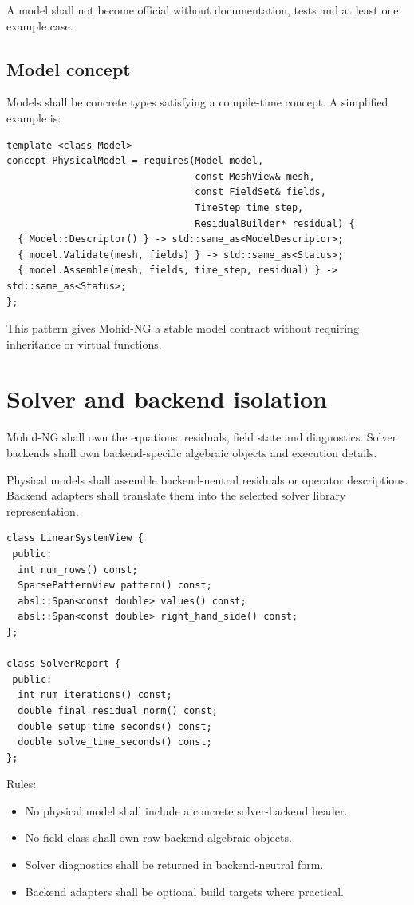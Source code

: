 \documentclass[11pt,a4paper]{article}
\begin{document}
A model shall not become official without documentation, tests and at least one example case.

\subsection{Model concept}

Models shall be concrete types satisfying a compile-time concept. A simplified example is:

\begin{lstlisting}
template <class Model>
concept PhysicalModel = requires(Model model,
                                 const MeshView& mesh,
                                 const FieldSet& fields,
                                 TimeStep time_step,
                                 ResidualBuilder* residual) {
  { Model::Descriptor() } -> std::same_as<ModelDescriptor>;
  { model.Validate(mesh, fields) } -> std::same_as<Status>;
  { model.Assemble(mesh, fields, time_step, residual) } -> std::same_as<Status>;
};
\end{lstlisting}

This pattern gives Mohid-NG a stable model contract without requiring inheritance or virtual functions.

\section{Solver and backend isolation}

Mohid-NG shall own the equations, residuals, field state and diagnostics. Solver backends shall own backend-specific algebraic objects and execution details.

Physical models shall assemble backend-neutral residuals or operator descriptions. Backend adapters shall translate them into the selected solver library representation.

\begin{lstlisting}
class LinearSystemView {
 public:
  int num_rows() const;
  SparsePatternView pattern() const;
  absl::Span<const double> values() const;
  absl::Span<const double> right_hand_side() const;
};

class SolverReport {
 public:
  int num_iterations() const;
  double final_residual_norm() const;
  double setup_time_seconds() const;
  double solve_time_seconds() const;
};
\end{lstlisting}

Rules:

\begin{itemize}
  \item No physical model shall include a concrete solver-backend header.
  \item No field class shall own raw backend algebraic objects.
  \item Solver diagnostics shall be returned in backend-neutral form.
  \item Backend adapters shall be optional build targets where practical.
\end{itemize}
\end{document}
